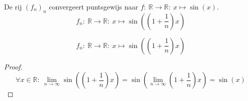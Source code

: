 \documentclass[main.tex]{subfiles}
\begin{document}
\begin{vb}
  De rij $(f_{n})_{n}$ convergeert puntsgewijs naar $f:\ \mathbb{R} \rightarrow \mathbb{R}:\ x \mapsto \sin(x)$.
  \[ f_{n}:\ \mathbb{R} \rightarrow \mathbb{R}:\ x \mapsto \sin\left(\left(1+\frac{1}{n}\right)x\right) \]
  \noindent
  \begin{minipage}{.45\textwidth}
    \begin{figure}[H]
      \centering
    \end{figure}
  \end{minipage}
  \begin{minipage}{.45\textwidth}
  \[ f_{n}:\ \mathbb{R} \rightarrow \mathbb{R}:\ x \mapsto \sin\left(\left(1+\frac{1}{n}\right)x\right) \]
  \end{minipage}

  \begin{proof}
    \[
    \forall x\in \mathbb{R}:\
    \lim_{n\rightarrow\infty}\sin\left(\left(1+\frac{1}{n}\right)x\right)
    = \sin\left(\lim_{n\rightarrow\infty}\left(1+\frac{1}{n}\right)x\right)
    = \sin\left(x\right)
    \]
  \end{proof}
\end{vb}
\end{document}
